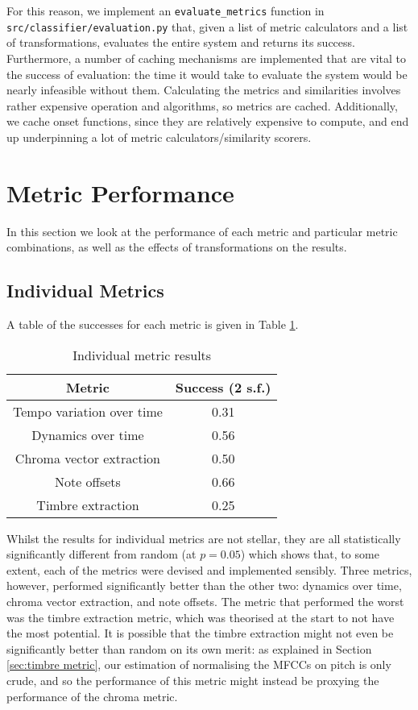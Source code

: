 \documentclass[oneside, class=book, 12pt, crop=false]{standalone}
\begin{document}
For this reason, we implement an \texttt{evaluate\_metrics} function in \texttt{src/classifier/evaluation.py} that, given a list of metric calculators and a list of transformations, evaluates the entire system and returns its success. Furthermore, a number of caching mechanisms are implemented that are vital to the success of evaluation: the time it would take to evaluate the system would be nearly infeasible without them. Calculating the metrics and similarities involves rather expensive operation and algorithms, so metrics are cached. Additionally, we cache onset functions, since they are relatively expensive to compute, and end up underpinning a lot of metric calculators/similarity scorers.

\section{Metric Performance}

In this section we look at the performance of each metric and particular metric combinations, as well as the effects of transformations on the results.

\subsection{Individual Metrics}

A table of the successes for each metric is given in Table \ref{table:metric results}. 

\begin{table}[h]
    \centering
    \begin{tabular}{cc}
        \textbf{Metric}&\textbf{Success} (2 s.f.) \\
        \midrule[0.15em]
        Tempo variation over time&0.31 \\
        Dynamics over time&0.56 \\
         Chroma vector extraction&0.50 \\
         Note offsets&0.66 \\
         Timbre extraction&0.25\\
    \end{tabular}
    \caption{Individual metric results}
    \label{table:metric results}
\end{table}

Whilst the results for individual metrics are not stellar, they are all statistically significantly different from random (at $p=0.05$) which shows that, to some extent, each of the metrics were devised and implemented sensibly. Three metrics, however, performed significantly better than the other two: dynamics over time, chroma vector extraction, and note offsets. The metric that performed the worst was the timbre extraction metric, which was theorised at the start to not have the most potential. It is possible that the timbre extraction might not even be significantly better than random on its own merit: as explained in Section \ref{sec:timbre metric}, our estimation of normalising the MFCCs on pitch is only crude, and so the performance of this metric might instead be proxying the performance of the chroma metric.
\end{document}
